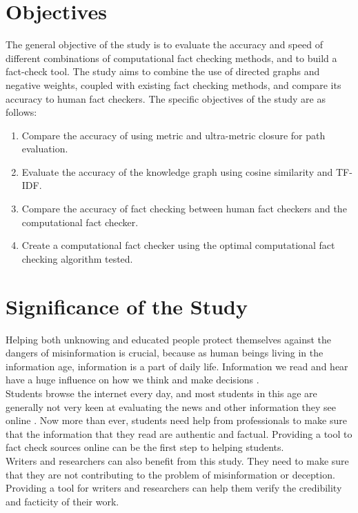 \documentclass[10pt,11pt,12pt,oneside]{book}
\begin{document}
		
	\section{Objectives}
		The general objective of the study is to evaluate the accuracy and speed of different combinations of computational fact checking methods, and to build a fact-check tool. The study aims to combine the use of directed graphs and negative weights, coupled with existing fact checking methods, and compare its accuracy to human fact checkers. The specific objectives of the study are as follows:
		\begin{enumerate}
		    \item Compare the accuracy of using metric and ultra-metric closure for path evaluation.
		    \item Evaluate the accuracy of the knowledge graph using cosine similarity and TF-IDF.
		    \item Compare the accuracy of fact checking between human fact checkers and the computational fact checker.
		    \item Create a computational fact checker using the optimal computational fact checking algorithm tested.
		\end{enumerate}

	\section{Significance of the Study}
		Helping both unknowing and educated people protect themselves against the dangers of misinformation is crucial, because as human beings living in the information age, information is a part of daily life. Information we read and hear have a huge influence on how we think and make decisions \cite{DelVicario_2016}.\\[8pt]
		
		Students browse the internet every day, and most students in this age are generally not very keen at evaluating the news and other information they see online \cite{mcgrew2017challenge}. Now more than ever, students need help from professionals to make sure that the information that they read are authentic and factual. Providing a tool to fact check sources online can be the first step to helping students.\\
	
		Writers and researchers can also benefit from this study. They need to make sure that they are not contributing to the problem of misinformation or deception. Providing a tool for writers and researchers can help them verify the credibility and facticity of their work.
		
\end{document}
